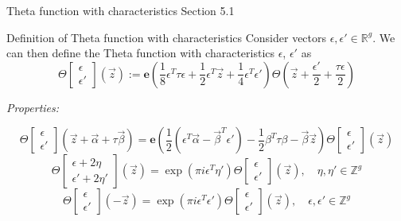 \documentclass[11pt,aspectratio=169]{beamer}
\newcommand{\ee}[0]{\mathbf{e}}
\begin{document}
\begin{frame}[noframenumbering]{Theta function with characteristics}{\tiny \cite{Ber06} Section 5.1}
    \begin{block}{Definition of Theta function with characteristics}
        Consider vectors $ \epsilon ,  \epsilon' \in \mathbb R^g$.
        We can then define the Theta function with characteristics $ \epsilon$, $ \epsilon'$ as
        \[\Theta\begin{bmatrix} \epsilon \\  \epsilon'\end{bmatrix}(\vec z) := 
        \ee\left(\frac{1}{8}\epsilon^T \tau \epsilon + \frac{1}{2}\epsilon^T \vec z + \frac{1}{4}\epsilon^T  \epsilon'\right)
        \Theta\left(\vec z + \frac{\epsilon'}{2}+\frac{\tau\epsilon}{2}\right)\] 
    \end{block}

    \emph{Properties:}

    \[\Theta\begin{bmatrix}\epsilon \\ \epsilon'\end{bmatrix}(\vec z + \vec \alpha + \tau \vec \beta) =
    \ee\left(\frac{1}{2}(\epsilon^T \vec \alpha - \vec \beta^T \epsilon') - \frac{1}{2} \beta^T \tau \beta - \vec \beta \vec z\right)
    \Theta\begin{bmatrix}\epsilon \\ \epsilon'\end{bmatrix}(\vec z)\]
    \[\Theta\begin{bmatrix}\epsilon + 2\eta \\ \epsilon' + 2\eta' \end{bmatrix}(\vec z) = \exp(\pi i \epsilon^T \eta')
    \Theta\begin{bmatrix}\epsilon \\ \epsilon'\end{bmatrix}(\vec z) , \quad \eta,\eta' \in \mathbb Z^g\]
    \[\Theta\begin{bmatrix}\epsilon \\ \epsilon'\end{bmatrix}(-\vec z) = \exp(\pi i \epsilon^T \epsilon') \Theta\begin{bmatrix}\epsilon \\ \epsilon'\end{bmatrix}(\vec z) , \quad \epsilon,\epsilon' \in \mathbb Z^g\]
\end{frame}
\end{document}
